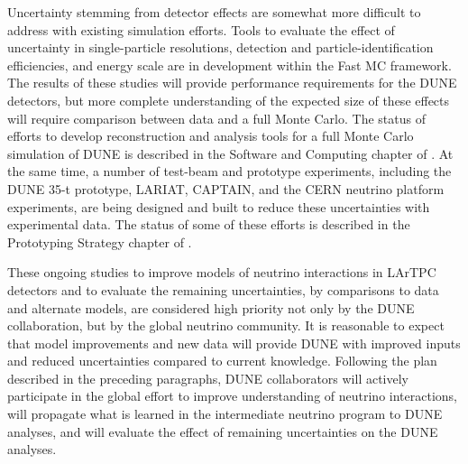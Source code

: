 Uncertainty stemming from detector effects
are somewhat more difficult to address with existing
simulation efforts. Tools to evaluate the effect of uncertainty in single-particle resolutions,
detection and particle-identification efficiencies, and energy scale are in development within
the Fast MC framework. The results of these studies will provide performance requirements
for the DUNE detectors, but more complete understanding of the expected size of these effects
will require comparison between data and a full Monte Carlo.
The status of efforts to develop reconstruction and analysis tools for a full Monte Carlo simulation
of DUNE is described in %
the Software and Computing chapter of \voldune. At the same time,
a number of test-beam and prototype experiments, including the DUNE 35-t prototype,
LARIAT, CAPTAIN, and the CERN neutrino platform experiments, are being designed and built to reduce these
uncertainties with experimental data. The status of some of these efforts is described in the Prototyping
Strategy chapter of \voldune.

These ongoing studies to improve models of neutrino interactions in LArTPC detectors and
to evaluate the remaining uncertainties, by comparisons to data and alternate models, 
are considered high priority not only by the DUNE collaboration, but by the global neutrino community.
It is reasonable to expect that model improvements and new data will provide DUNE with improved inputs
and reduced uncertainties compared to current knowledge. Following the plan described in the preceding
paragraphs, DUNE collaborators will actively participate in the global effort to improve understanding
of neutrino interactions, will propagate what is learned
in the intermediate neutrino program to DUNE analyses, and will
evaluate the effect of remaining uncertainties on the DUNE analyses.









